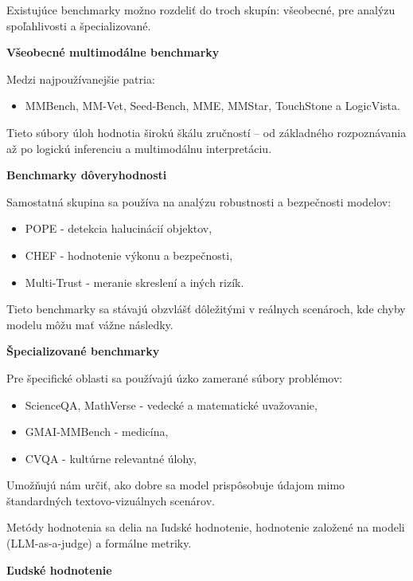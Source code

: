 \documentclass[]{tukediphc}
\begin{document}
Existujúce benchmarky možno rozdeliť do troch skupín: všeobecné, pre analýzu spoľahlivosti a špecializované\cite{researchgate:A_Survey_on_Evaluation_of_Multimodal_Large_Language_Models}.

\textbf{Všeobecné multimodálne benchmarky}

Medzi najpoužívanejšie patria:
\begin{itemize}
\item MMBench, MM-Vet, Seed-Bench, MME, MMStar, TouchStone a LogicVista.
\end{itemize}

Tieto súbory úloh hodnotia širokú škálu zručností – od základného rozpoznávania až po logickú inferenciu a multimodálnu interpretáciu\cite{researchgate:A_Survey_on_Evaluation_of_Multimodal_Large_Language_Models}. 

\textbf{Benchmarky dôveryhodnosti}

Samostatná skupina sa používa na analýzu robustnosti a bezpečnosti modelov:

\begin{itemize}
\item POPE - detekcia halucinácií objektov,
\item CHEF - hodnotenie výkonu a bezpečnosti,
\item Multi-Trust - meranie skreslení a iných rizík.
\end{itemize}


Tieto benchmarky sa stávajú obzvlášť dôležitými v reálnych scenároch, kde chyby modelu môžu mať vážne následky\cite{researchgate:A_Survey_on_Evaluation_of_Multimodal_Large_Language_Models}.

\textbf{Špecializované benchmarky}

Pre špecifické oblasti sa používajú úzko zamerané súbory problémov:
\begin{itemize}
\item ScienceQA, MathVerse - vedecké a matematické uvažovanie,
\item GMAI-MMBench - medicína,
\item CVQA - kultúrne relevantné úlohy,
\end{itemize}

Umožňujú nám určiť, ako dobre sa model prispôsobuje údajom mimo štandardných textovo-vizuálnych scenárov.

Metódy hodnotenia sa delia na ľudské hodnotenie, hodnotenie založené na modeli (LLM-as-a-judge) a formálne metriky.

\textbf{Ľudské hodnotenie}
\end{document}
